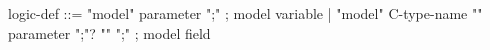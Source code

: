 \begin{syntax}
  logic-def ::= 
    { "model" parameter ";" } ; model variable
  | { "model" C-type-name "{" parameter ";"? "}" ";" } ; model field
\end{syntax}
